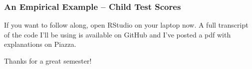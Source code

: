 \documentclass{beamer}
\begin{document}
\begin{frame}
\frametitle{An Empirical Example -- Child Test Scores}

If you want to follow along, open RStudio on your laptop now. A full transcript of the code I'll be using is available on GitHub \href{https://gist.github.com/fditraglia/7772528}{\textcolor{blue}{}} and I've posted a pdf with explanations on Piazza.

\end{frame}

\begin{frame}
\begin{center}

\Huge Thanks for a great semester!

\end{center}

\end{frame}
\end{document}
